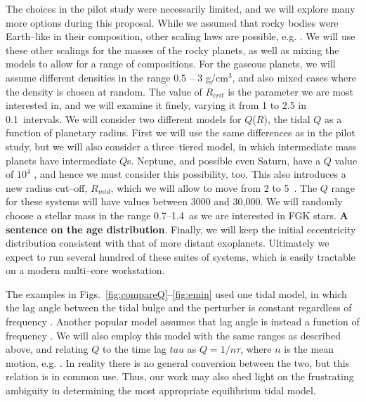 The choices in the pilot study were necessarily limited, and we will
explore many more options during this proposal.  While we assumed that
rocky bodies were Earth--like in their composition, other scaling laws
are possible, e.g.  \cite{Seager07,Fortney07,Lissauer10}.  We will use
these other scalings for the masses of the rocky planets, as well as
mixing the models to allow for a range of compositions.  For the
gaseous planets, we will assume different densities in the range 0.5
-- 3 g/cm$^3$, and also mixed cases where the density is chosen at
random.  The value of $R_{crit}$ is the parameter we are most
interested in, and we will examine it finely, varying it from 1 to 2.5
\rearth in 0.1~\rearth intervals.  We will consider two different
models for $Q$($R$), the tidal $Q$ as a function of planetary radius.
First we will use the same differences as in the pilot study, but we
will also consider a three--tiered model, in which intermediate mass
planets have intermediate $Q$s.  Neptune, and possible even Saturn,
have a $Q$ value of $10^4$ \citep{Hamliton04,Makarov12}, and hence we
must consider this possibility, too.  This also introduces a new
radius cut--off, $R_{mid}$, which we will allow to move from 2 to
5~\rearth.  The $Q$ range for these systems will have values between
3000 and 30,000.  We will randomly choose a stellar mass in the range
0.7--1.4~\msun as we are interested in FGK stars.  {\bf A sentence on
  the age distribution}. Finally, we will keep the initial
eccentricity distribution consistent with that of more distant
exoplanets.  Ultimately we expect to run several hundred of these
suites of systems, which is easily tractable on a modern multi--core
workstation.

The examples in Figs.~\ref{fig:compareQ}--\ref{fig:emin} used one
tidal model, in which the lag angle between the tidal bulge and the
perturber is constant regardless of frequency
\citep[e.g.][]{GoldreichSoter66,Jackson08}.  Another popular model
assumes that lag angle is instead a function of frequency
\citep[e.g.][]{Hut81,Matsumura10}.  We will also employ this model
with the same ranges as described above, and relating $Q$ to the time
lag $tau$ as $Q = 1/n\tau$, where $n$ is the mean motion, e.g.
\cite{Correia12}.  In reality there is no general conversion between
the two, but this relation is in common use.  Thus, our work may also
shed light on the frustrating ambiguity in determining the most
appropriate equilibrium tidal model.

\medskip
{\centerline{}}
\smallskip

